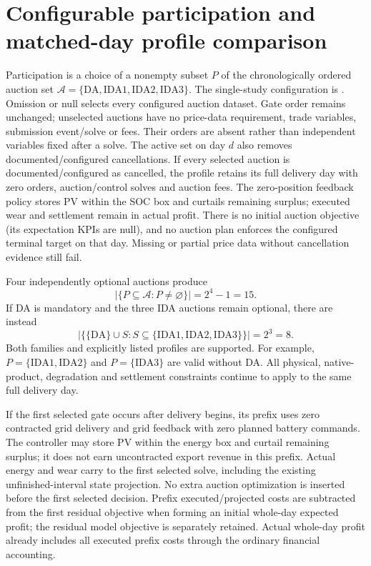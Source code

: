 \documentclass[11pt,a4paper]{article}
\begin{document}
\section{Configurable participation and matched-day profile comparison}

Participation is a choice of a nonempty subset $P$ of the chronologically ordered
auction set $\mathcal A=\{\mathrm{DA},\mathrm{IDA1},\mathrm{IDA2},\mathrm{IDA3}\}$.
The single-study configuration is
. Omission or null selects every
configured auction dataset. Gate order remains unchanged; unselected auctions
have no price-data requirement, trade variables, submission event/solve or fees.
Their orders are absent rather than independent variables fixed after a solve.
The active set on day $d$ also removes documented/configured cancellations.
If every selected auction is documented/configured as cancelled, the profile
retains its full delivery day with zero orders, auction/control solves and
auction fees. The zero-position feedback policy stores PV within the SOC box
and curtails remaining surplus; executed wear and settlement remain in actual
profit. There is no initial auction objective (its expectation KPIs are null),
and no auction plan enforces the configured terminal target on that day. Missing
or partial price data without cancellation evidence still fail.

Four independently optional auctions produce
\begin{equation}
 |\{P\subseteq\mathcal A:P\ne\varnothing\}|=2^4-1=15.
\end{equation}
If DA is mandatory and the three IDA auctions remain optional, there are instead
\begin{equation}
 |\{\{\mathrm{DA}\}\cup S:S\subseteq\{\mathrm{IDA1},\mathrm{IDA2},\mathrm{IDA3}\}\}|=2^3=8.
\end{equation}
Both families and explicitly listed profiles are supported. For example,
$P=\{\mathrm{IDA1},\mathrm{IDA2}\}$ and $P=\{\mathrm{IDA3}\}$ are valid without DA.
All physical, native-product, degradation and settlement constraints continue to
apply to the same full delivery day.

If the first selected gate occurs after delivery begins, its prefix uses zero
contracted grid delivery and grid feedback with zero planned battery commands.
The controller may store PV within the energy box and curtail remaining surplus;
it does not earn uncontracted export revenue in this prefix. Actual energy and
wear carry to the first selected solve, including the existing unfinished-interval
state projection. No extra auction optimization is inserted before the first
selected decision. Prefix executed/projected costs are subtracted from the first
residual objective when forming an initial whole-day expected profit; the residual
model objective is separately retained. Actual whole-day profit already includes
all executed prefix costs through the ordinary financial accounting.
\end{document}
